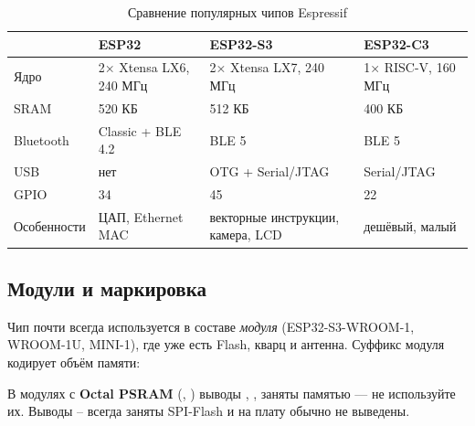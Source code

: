 \begin{table}[H]
\centering\small
\begin{tabularx}{\textwidth}{@{}l X X X@{}}
\toprule
 & \textbf{ESP32} & \textbf{ESP32-S3} & \textbf{ESP32-C3} \\
\midrule
Ядро & 2× Xtensa LX6, 240 МГц & 2× Xtensa LX7, 240 МГц & 1× RISC-V, 160 МГц \\
SRAM & 520 КБ & 512 КБ & 400 КБ \\
Bluetooth & Classic + BLE 4.2 & BLE 5 & BLE 5 \\
USB & нет & OTG + Serial/JTAG & Serial/JTAG \\
GPIO & 34 & 45 & 22 \\
Особенности & ЦАП, Ethernet MAC & векторные инструкции, камера, LCD & дешёвый, малый \\
\bottomrule
\end{tabularx}
\caption{Сравнение популярных чипов Espressif}
\end{table}

\subsection{Модули и маркировка}

Чип почти всегда используется в составе \emph{модуля} (ESP32-S3-WROOM-1, WROOM-1U, MINI-1),
где уже есть Flash, кварц и антенна. Суффикс модуля кодирует объём памяти:

\begin{center}
\end{center}

\begin{caution}
В модулях с \textbf{Octal PSRAM} (, ) выводы , ,  заняты
памятью --- не используйте их. Выводы -- всегда заняты SPI-Flash и на плату обычно не выведены.
\end{caution}

